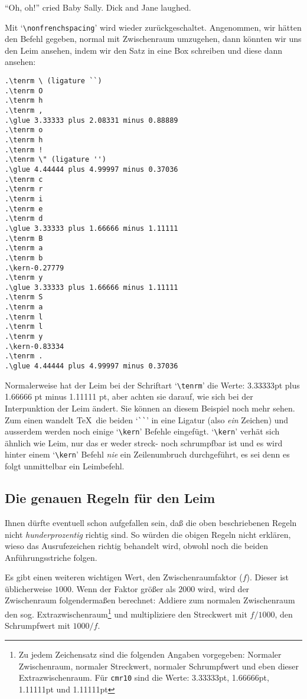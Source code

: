 {\frenchspacing
``Oh, oh!'' cried Baby Sally. Dick and Jane laughed.}\medskip

Mit `\verb|\nonfrenchspacing|' wird wieder zur\"uckgeschaltet.
Angenommen, wir h\"atten den Befehl gegeben, normal mit
Zwischenraum
umzugehen, dann k\"onnten wir uns den Leim ansehen, indem wir den Satz
in eine Box schreiben und diese dann ansehen:
\begin{verbatim}
.\tenrm \ (ligature ``)
.\tenrm O
.\tenrm h
.\tenrm ,
.\glue 3.33333 plus 2.08331 minus 0.88889
.\tenrm o
.\tenrm h
.\tenrm !
.\tenrm \" (ligature '')
.\glue 4.44444 plus 4.99997 minus 0.37036
.\tenrm c
.\tenrm r
.\tenrm i
.\tenrm e
.\tenrm d
.\glue 3.33333 plus 1.66666 minus 1.11111
.\tenrm B
.\tenrm a
.\tenrm b
.\kern-0.27779
.\tenrm y
.\glue 3.33333 plus 1.66666 minus 1.11111
.\tenrm S
.\tenrm a
.\tenrm l
.\tenrm l
.\tenrm y
.\kern-0.83334
.\tenrm .
.\glue 4.44444 plus 4.99997 minus 0.37036
\end{verbatim}
Normalerweise hat der Leim bei der 
Schriftart `\verb|\tenrm|' die
Werte: 3.33333pt plus 1.66666 pt minus 1.11111 pt, aber achten sie
darauf, wie sich bei der 
Interpunktion der Leim \"andert. Sie k\"onnen an
diesem Beispiel noch mehr sehen. Zum einen wandelt \TeX\ die beiden
`\verb|``|' in eine 
Ligatur (also {\em ein} Zeichen) und ausserdem
werden noch einige `\verb|\kern|' Befehle eingef\"ugt. `\verb|\kern|'
verh\"at sich \"ahnlich wie Leim, nur das er weder streck- noch
schrumpfbar ist und es wird hinter einem `\verb|\kern|' Befehl {\em
nie} ein Zeilenumbruch durchgef\"uhrt, es sei denn es folgt unmittelbar
ein Leimbefehl.
\subsection{Die genauen Regeln f\"ur den Leim}
Ihnen d\"urfte eventuell schon aufgefallen sein, da\ss{} die oben
beschriebenen Regeln nicht {\em hunderprozentig} richtig sind. So
w\"urden die obigen Regeln nicht erkl\"aren, wieso das Ausrufezeichen
richtig behandelt wird, obwohl noch die beiden
Anf\"uhrungsstriche
folgen.

Es gibt einen weiteren wichtigen Wert, den 
Zwischenraumfaktor ($f$).
Dieser ist \"ublicherweise $1000$. Wenn der Faktor gr\"o\ss{}er als $2000$
wird, wird der 
Zwischenraum folgenderma\ss{}en berechnet: Addiere zum
normalen Zwischenraum den sog. Extrazwischenraum\footnote{Zu jedem
Zeichensatz sind die folgenden Angaben vorgegeben: Normaler
Zwischenraum, normaler Streckwert, normaler 
Schrumpfwert und eben
dieser Extrazwischenraum. F\"ur {\tt cmr10} sind die Werte: 3.33333pt,
1.66666pt, 1.11111pt und 1.11111pt} und multipliziere den Streckwert
mit $f/1000$, den Schrumpfwert mit $1000/f$.

